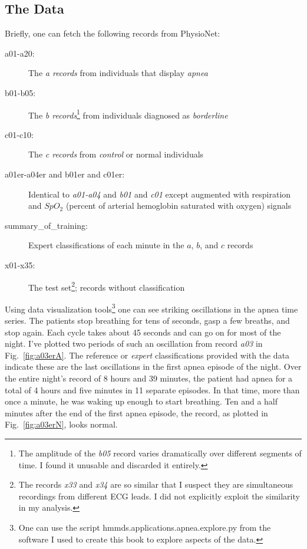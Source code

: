 \subsection{The Data}
\label{sec:data}

Briefly, one can fetch the following records from PhysioNet:
\begin{description}
\item[a01-a20:] The \emph{a records} from individuals that display
  \emph{apnea}
\item[b01-b05:] The \emph{b records}\footnote{The amplitude of the
    \emph{b05} record varies dramatically over different segments of
    time.  I found it unusable and discarded it entirely.} from
  individuals diagnosed as \emph{borderline}
\item[c01-c10:] The \emph{c records} from \emph{control} or normal
  individuals
\item[a01er-a04er and b01er and c01er:] Identical to \emph{a01-a04}
  and \emph{b01} and \emph{c01} except augmented with respiration and
  $SpO_2$ (percent of arterial hemoglobin saturated with oxygen)
   signals
\item[summary\_of\_training:] Expert classifications of each minute in
  the $a$, $b$, and $c$ records
\item[x01-x35:] The test set\footnote{The records \emph{x33} and
    \emph{x34} are so similar that I suspect they are simultaneous
    recordings from different ECG leads.  I did not explicitly exploit
  the similarity in my analysis.}; records without classification
\end{description}

Using data visualization tools\footnote{One can use the script
  hmmds.applications.apnea.explore.py from the software I used to
  create this book to explore aspects of the data.} one can see
striking oscillations in the apnea time series.  The patients stop
breathing for tens of seconds, gasp a few breaths, and stop again.
Each cycle takes about 45 seconds and can go on for most of the night.
I've plotted two periods of such an oscillation from record \emph{a03}
in Fig.~\ref{fig:a03erA}.  The reference or \emph{expert}
classifications provided with the data indicate these are the last
oscillations in the first apnea episode of the night.  Over the entire
night's record of 8 hours and 39 minutes, the patient had apnea for a
total of 4 hours and five minutes in 11 separate episodes.  In that
time, more than once a minute, he was waking up enough to start
breathing.  Ten and a half minutes after the end of the first apnea
episode, the record, as plotted in Fig.~\ref{fig:a03erN}, looks
normal.

